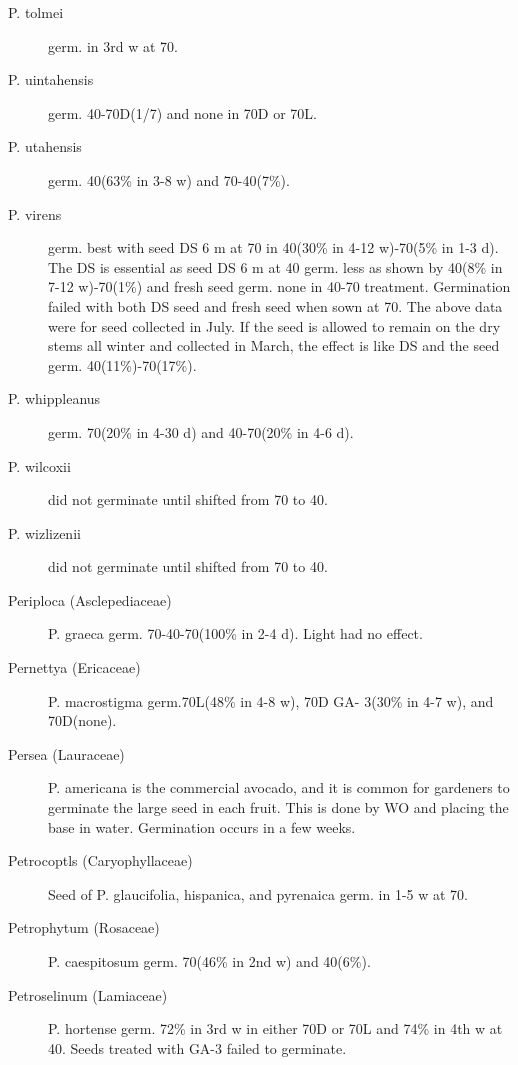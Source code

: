 \begin{description}
\item[P. tolmei] germ. in 3rd w at 70.
\item[P. uintahensis] germ. 40-70D(1/7) and none in 70D or 70L.
\item[P. utahensis] germ. 40(63\% in 3-8 w) and 70-40(7\%).
\item[P. virens] germ. best with seed DS 6 m at 70 in 40(30\% in 4-12 w)-70(5\% in 1-3
d). The DS is essential as seed DS 6 m at 40 germ. less as shown by 40(8\% in 7-12
w)-70(1\%) and fresh seed germ. none in 40-70 treatment. Germination failed with
both DS seed and fresh seed when sown at 70. The above data were for seed
collected in July. If the seed is allowed to remain on the dry stems all winter and
collected in March, the effect is like DS and the seed germ. 40(11\%)-70(17\%).
\item[P. whippleanus] germ. 70(20\% in 4-30 d) and 40-70(20\% in 4-6 d).
\item[P. wilcoxii] did not germinate until shifted from 70 to 40.
\item[P. wizlizenii] did not germinate until shifted from 70 to 40.

\item[Periploca (Asclepediaceae)] P. graeca germ. 70-40-70(100\% in 2-4 d).
Light had no effect.
\item[Pernettya (Ericaceae)] P. macrostigma germ.70L(48\% in 4-8 w), 70D GA-
3(30\% in 4-7 w), and 70D(none).
\item[Persea (Lauraceae)] P. americana is the commercial avocado, and it is
common for gardeners to germinate the large seed in each fruit. This is done by WO
and placing the base in water. Germination occurs in a few weeks.
\item[Petrocoptls (Caryophyllaceae)] Seed of P. glaucifolia, hispanica, and
pyrenaica germ. in 1-5 w at 70.
\item[Petrophytum (Rosaceae)] P. caespitosum germ. 70(46\% in 2nd w) and
40(6\%).
\item[Petroselinum (Lamiaceae)] P. hortense germ. 72\% in 3rd w in either 70D
or 70L and 74\% in 4th w at 40. Seeds treated with GA-3 failed to germinate.


\end{description}
